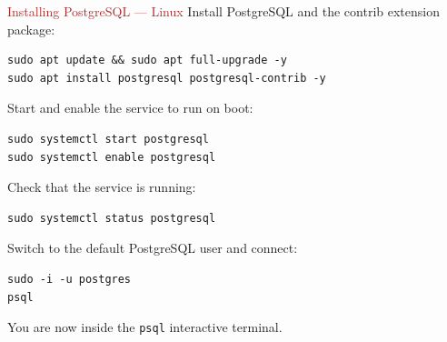 \begin{frame}[fragile]{\textcolor{brown}{Installing PostgreSQL — Linux}}
  Install PostgreSQL and the contrib extension package:
\begin{lstlisting}[style=bash]
sudo apt update && sudo apt full-upgrade -y
sudo apt install postgresql postgresql-contrib -y
\end{lstlisting}

  Start and enable the service to run on boot:
\begin{lstlisting}[style=bash]
sudo systemctl start postgresql
sudo systemctl enable postgresql
\end{lstlisting}

  Check that the service is running:
\begin{lstlisting}[style=bash]
sudo systemctl status postgresql
\end{lstlisting}

  Switch to the default PostgreSQL user and connect:
\begin{lstlisting}[style=bash]
sudo -i -u postgres
psql
\end{lstlisting}

  You are now inside the \texttt{psql} interactive terminal.
\end{frame}